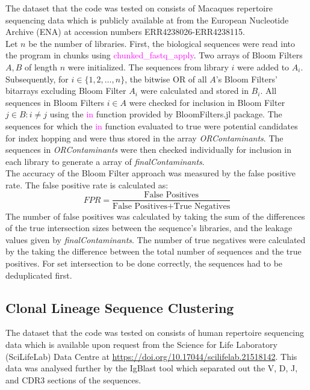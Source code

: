 \documentclass[times, twoside, watermark]{zHenriquesLab-StyleBioRxiv}
\begin{document}
The dataset that the code was tested on consists of Macaques repertoire sequencing data \cite{macaqueData} which is publicly available at from the European Nucleotide Archive (ENA) at accession numbers ERR4238026-ERR4238115. \\

Let $n$ be the number of libraries. First, the biological sequences were read into the program in chunks using \textcolor{magenta}{chunked\_fastq\_apply}. Two arrays of Bloom Filters $A, B$ of length $n$ were initialized. The sequences from library $i$ were added to $A_i$. Subsequently, for $i \in \{1, 2,\ldots, n\} $, the bitwise OR of all $A$'s Bloom Filters' bitarrays excluding Bloom Filter $A_i$ were calculated and stored in $B_i$. All sequences in Bloom Filters $i \in A$ were checked for inclusion in Bloom Filter $j \in B : i \neq j$ using the \textcolor{magenta}{in} function provided by BloomFilters.jl package. The sequences for which the \textcolor{magenta}{in} function evaluated to true were potential candidates for index hopping and were thus stored in the array \emph{ORContaminants}. The sequences in \emph{ORContaminants} were then checked individually for inclusion in each library to generate a array of \emph{finalContaminants}. \\

The accuracy of the Bloom Filter approach was measured by the false positive rate. The false positive rate is calculated as:
$$FPR = \frac{\text{False Positives}}{\text{False Positives} + \text{True Negatives}}$$
The number of false positives was calculated by taking the sum of the differences of the true intersection sizes between the sequence's libraries, and the leakage values given by \emph{finalContaminants}. The number of true negatives were calculated by the taking the difference between the total number of sequences and the true positives. For set intersection to be done correctly, the sequences had to be deduplicated first. 

\subsection*{Clonal Lineage Sequence Clustering}

The dataset that the code was tested on consists of human repertoire sequencing data \cite{humanData} which is available upon request from the Science for Life Laboratory (SciLifeLab) Data Centre at \href{https://doi.org/10.17044/scilifelab.21518142}{https://doi.org/10.17044/scilifelab.21518142}. This data was analysed further by the IgBlast tool which separated out the V, D, J, and CDR3 sections of the sequences. \\ 
\end{document}
